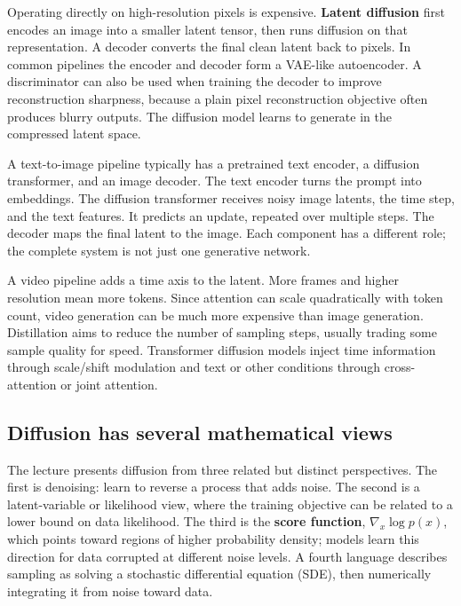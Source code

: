 Operating directly on high-resolution pixels is expensive. \textbf{Latent diffusion} first encodes an image into a smaller latent tensor, then runs diffusion on that representation. A decoder converts the final clean latent back to pixels. In common pipelines the encoder and decoder form a VAE-like autoencoder. A discriminator can also be used when training the decoder to improve reconstruction sharpness, because a plain pixel reconstruction objective often produces blurry outputs. The diffusion model learns to generate in the compressed latent space.

A text-to-image pipeline typically has a pretrained text encoder, a diffusion transformer, and an image decoder. The text encoder turns the prompt into embeddings. The diffusion transformer receives noisy image latents, the time step, and the text features. It predicts an update, repeated over multiple steps. The decoder maps the final latent to the image. Each component has a different role; the complete system is not just one generative network.

A video pipeline adds a time axis to the latent. More frames and higher resolution mean more tokens. Since attention can scale quadratically with token count, video generation can be much more expensive than image generation. Distillation aims to reduce the number of sampling steps, usually trading some sample quality for speed. Transformer diffusion models inject time information through scale/shift modulation and text or other conditions through cross-attention or joint attention.

\subsection{Diffusion has several mathematical views}\label{04-visual-computing-ii-ch031-diffusion-has-several-mathematical-views}

\hypertarget{04-visual-computing-ii-ch031-diffusion-has-several-mathematical-views}{}

The lecture presents diffusion from three related but distinct perspectives. The first is denoising: learn to reverse a process that adds noise. The second is a latent-variable or likelihood view, where the training objective can be related to a lower bound on data likelihood. The third is the \textbf{score function}, \(\nabla_x\log p(x)\), which points toward regions of higher probability density; models learn this direction for data corrupted at different noise levels. A fourth language describes sampling as solving a stochastic differential equation (SDE), then numerically integrating it from noise toward data.

